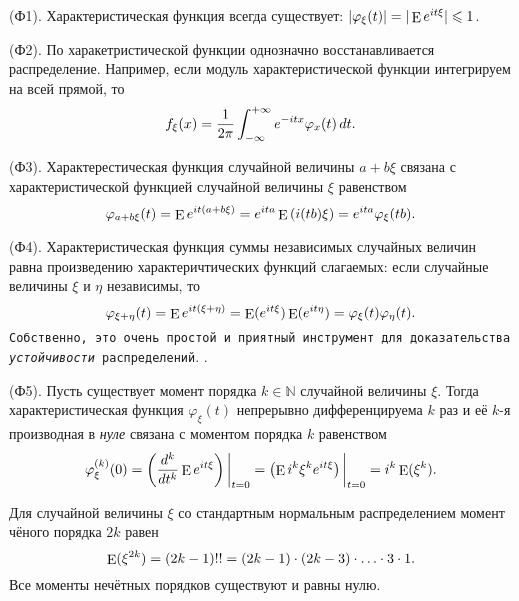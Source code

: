 (Ф1). Характеристическая функция всегда существует: $|\varphi_\xi (t) | = |\mathop{\mathrm{E}}\nolimits e^{i t \xi} | \leqslant 1$.

(Ф2). По харакетристической функции однозначно восстанавливается распределение. Например, если модуль характеристической функции интегрируем на всей прямой, то 
\begin{equation*}
    f_\xi (x) = \frac{1}{2\pi} \int_{-\infty}^{+\infty} e^{-itx} \varphi_x (t) \, d t.
\end{equation*}

(Ф3). Характерестическая функция случайной величины $a + b \xi$ связана с характеристической функцией случайной величины $\xi$ равенством
\begin{equation*}
    \varphi_{a + b \xi} (t) = \mathop{\mathrm{E}}\nolimits e^{i t (a + b \xi)} = e^{i t a} \mathop{\mathrm{E}}\nolimits \left(
        i (tb) \xi
    \right) = e^{i t a} \varphi_\xi (tb).
\end{equation*}

(Ф4). Характеристическая функция суммы независимых случайных величин равна произведению характеричтических функций слагаемых: если случайные величины $\xi$ и $\eta$ независимы, то
\begin{equation*}
    \varphi_{\xi + \eta} (t) = \mathop{\mathrm{E}}\nolimits e^{i t (\xi + \eta)} = \mathop{\mathrm{E}}\nolimits (e^{i t \xi}) \mathop{\mathrm{E}}\nolimits (e^{i t \eta}) = \varphi_\xi (t) \varphi_\eta (t).
\end{equation*}
\texttt{Собственно, это очень простой и приятный инструмент для доказательства \textit{устойчивости} распределений}. .

(Ф5). Пусть существует момент порядка $k \in \mathbb{N}$ случайной величины $\xi$. Тогда характеристическая функция $\varphi_\xi (t)$ непрерывно дифференцируема $k$ раз и её $k$-я производная в \textit{нуле} связана с моментом порядка $k$ равенством
\begin{equation*}
    \varphi_\xi^{(k)} (0) = \left(
        \frac{d^k }{d t^k} \mathop{\mathrm{E}}\nolimits e^{i t \xi}
    \right) \bigg|_{t=0} = \left(
        \mathop{\mathrm{E}}\nolimits i^k \xi^k e^{i t \xi}
    \right) \bigg|_{t=0} = i^k \mathop{\mathrm{E}}\nolimits(\xi^k).
\end{equation*} 

\begin{to_lem}
    Для случайной величины $\xi$ со стандартным нормальным распределением момент чёного порядка $2k$ равен
    \begin{equation*}
        \mathop{\mathrm{E}}\nolimits (\xi^{2k}) = (2 k - 1) !! = (2k -1) \cdot (2k-3) \cdot \ldots \cdot 3 \cdot 1.
    \end{equation*}
    Все моменты нечётных порядков существуют и равны нулю.
\end{to_lem}

